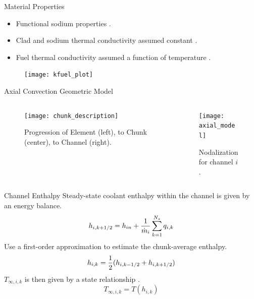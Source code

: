 \begin{frame}{Material Properties}
  \begin{itemize}
    \item Functional sodium properties \cite{sodiumProp}.
    \item Clad and sodium thermal conductivity assumed constant \cite{ht9Prop}.
    \item Fuel thermal conductivity assumed a function of temperature
      \cite{fuelProp}.
  \end{itemize}
  \begin{figure}
    \centering
    \texttt{[image: kfuel\_plot]}
    \label{fig:kfuel_plot}
  \end{figure}
\end{frame}

\begin{frame}{Axial Convection Geometric Model}
  \begin{columns}
    \begin{column}{0.5\textwidth}
      \begin{figure}
        \centering
        \texttt{[image: chunk\_description]}
        \caption{Progression of Element (left), to Chunk (center), to Channel
          (right).}
        \label{fig:chunk_description}
      \end{figure}
    \end{column}
    \begin{column}{0.5\textwidth}
      \begin{figure}
        \centering
        \texttt{[image: axial\_model]}
        \caption{Nodalization for channel $i$.}
        \label{fig:axial_model}
      \end{figure}
    \end{column}
  \end{columns}
\end{frame}

\begin{frame}{Channel Enthalpy}
  Steady-state coolant enthalpy within the channel is given by an energy
  balance.
  \begin{equation}
    h_{i,k+1/2} = h_{in} + \frac{1}{\dot{m}_i} \sum_{k=1}^{N_z} q_{i,k}
  \end{equation}
  Use a first-order approximation to estimate the chunk-average enthalpy.
  \begin{equation}
    h_{i,k} = \frac{1}{2} (h_{i,k-1/2}+h_{i,k+1/2})
  \end{equation}
  $T_{\infty,i,k}$ is then given by a state relationship \cite{sodiumProp}.
  \begin{equation}
    T_{\infty,i,k} = T(h_{i,k})
  \end{equation}
\end{frame}

